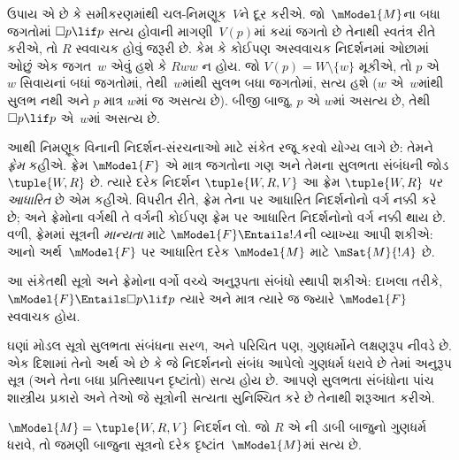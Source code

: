 ઉપાય એ છે કે સમીકરણમાંથી ચલ-નિમણૂક~$V$ને દૂર કરીએ.
જો~$\mModel{M}$ના બધા જગતોમાં $\Box p \lif p$ સત્ય
હોવાની માગણી~$V(p)$માં કયાં જગતો છે તેનાથી સ્વતંત્ર
રીતે કરીએ, તો $R$ સ્વવાચક હોવું જરૂરી છે. કેમ કે
કોઈપણ અસ્વવાચક નિદર્શનમાં ઓછામાં ઓછું એક જગત~$w$
એવું હશે કે $Rww$ ન હોય. જો $V(p) =
W \setminus \{w\}$ મૂકીએ, તો $p$ એ~$w$ સિવાયનાં
બધાં જગતોમાં, તેથી~$w$માંથી સુલભ બધા જગતોમાં,
સત્ય હશે ($w$ એ~$w$માંથી સુલભ નથી અને $p$ માત્ર
$w$માં જ અસત્ય છે). બીજી બાજુ, $p$ એ $w$માં
અસત્ય છે, તેથી $\Box
p \lif p$ એ~$w$માં અસત્ય છે.

આથી નિમણૂક વિનાની નિદર્શન-સંરચનાઓ માટે સંકેત
રજૂ કરવો યોગ્ય લાગે છે: તેમને \emph{ફ્રેમ} કહીએ.
ફ્રેમ $\mModel{F}$ એ માત્ર જગતોના ગણ અને તેમના
સુલભતા સંબંધની જોડ $\tuple{W, R}$ છે. ત્યારે
દરેક નિદર્શન $\tuple{W, R, V}$ આ ફ્રેમ
$\tuple{W, R}$ \emph{પર આધારિત} છે એમ કહીએ.
વિપરીત રીતે, ફ્રેમ તેના પર આધારિત નિદર્શનોનો
વર્ગ નક્કી કરે છે; અને ફ્રેમોના વર્ગથી તે વર્ગની
કોઈપણ ફ્રેમ પર આધારિત નિદર્શનોનો વર્ગ નક્કી થાય છે.
વળી, ફ્રેમમાં સૂત્રની \emph{માન્યતા} માટે
$\mModel{F} \Entails !A$ની વ્યાખ્યા આપી શકીએ: આનો
અર્થ~$\mModel{F}$ પર આધારિત દરેક $\mModel{M}$ માટે
$\mSat{M}{!A}$ છે.

આ સંકેતથી સૂત્રો અને ફ્રેમોના વર્ગો વચ્ચે
અનુરૂપતા સંબંધો સ્થાપી શકીએ: દાખલા તરીકે,
$\mModel{F} \Entails \Box p \lif p$ ત્યારે અને માત્ર
ત્યારે જ જ્યારે $\mModel{F}$ સ્વવાચક હોય.
\endgroup

\begingroup
\makeatletter{}\makeatother


\label{guunit:OLP-0421}


ઘણાં મોડલ સૂત્રો સુલભતા સંબંધના સરળ, અને
પરિચિત પણ, ગુણધર્મોને લક્ષણરૂપ નીવડે છે. એક
દિશામાં તેનો અર્થ એ છે કે જે નિદર્શનનો સંબંધ
આપેલો ગુણધર્મ ધરાવે છે તેમાં અનુરૂપ સૂત્ર
(અને તેના બધા પ્રતિસ્થાપન દૃષ્ટાંતો) સત્ય હોય છે.
આપણે સુલભતા સંબંધોના પાંચ શાસ્ત્રીય પ્રકારો
અને તેઓ જે સૂત્રોની સત્યતા સુનિશ્ચિત કરે છે
તેનાથી શરૂઆત કરીએ.

\begin{thm}
  $\mModel{M} = \tuple{W, R, V}$ નિદર્શન લો.
  જો $R$ એ ની ડાબી બાજુનો ગુણધર્મ
  ધરાવે, તો જમણી બાજુના સૂત્રનો દરેક
  દૃષ્ટાંત~$\mModel{M}$માં સત્ય છે.
\end{thm}

